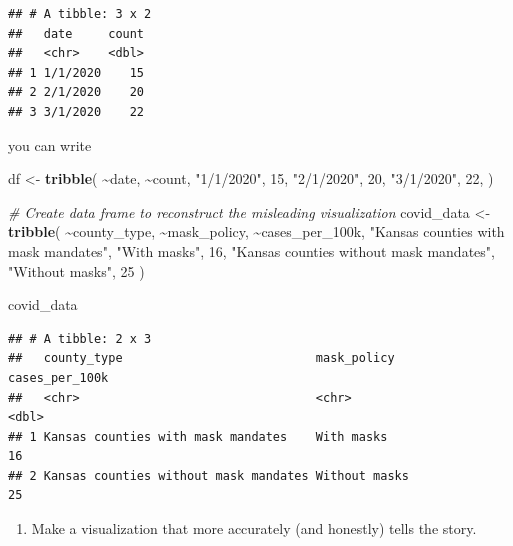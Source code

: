 \documentclass[
]{article}
\newenvironment{Shaded}{\begin{snugshade}}{\end{snugshade}}
\newcommand{\CommentTok}[1]{\textcolor[rgb]{0.56,0.35,0.01}{\textit{#1}}}
\newcommand{\DecValTok}[1]{\textcolor[rgb]{0.00,0.00,0.81}{#1}}
\newcommand{\FunctionTok}[1]{\textcolor[rgb]{0.13,0.29,0.53}{\textbf{#1}}}
\newcommand{\NormalTok}[1]{#1}
\newcommand{\OtherTok}[1]{\textcolor[rgb]{0.56,0.35,0.01}{#1}}
\newcommand{\SpecialCharTok}[1]{\textcolor[rgb]{0.81,0.36,0.00}{\textbf{#1}}}
\newcommand{\StringTok}[1]{\textcolor[rgb]{0.31,0.60,0.02}{#1}}
\providecommand{\tightlist}{%
  \setlength{\itemsep}{0pt}\setlength{\parskip}{0pt}}
\begin{document}
\begin{verbatim}
## # A tibble: 3 x 2
##   date     count
##   <chr>    <dbl>
## 1 1/1/2020    15
## 2 2/1/2020    20
## 3 3/1/2020    22
\end{verbatim}

you can write

\begin{Shaded}
\begin{Highlighting}[]
\NormalTok{df }\OtherTok{\textless{}{-}} \FunctionTok{tribble}\NormalTok{(}
  \SpecialCharTok{\textasciitilde{}}\NormalTok{date, }\SpecialCharTok{\textasciitilde{}}\NormalTok{count,}
  \StringTok{"1/1/2020"}\NormalTok{, }\DecValTok{15}\NormalTok{,}
  \StringTok{"2/1/2020"}\NormalTok{, }\DecValTok{20}\NormalTok{,}
  \StringTok{"3/1/2020"}\NormalTok{, }\DecValTok{22}\NormalTok{,}
\NormalTok{)}
\end{Highlighting}
\end{Shaded}

\begin{Shaded}
\begin{Highlighting}[]
\CommentTok{\# Create data frame to reconstruct the misleading visualization}
\NormalTok{covid\_data }\OtherTok{\textless{}{-}} \FunctionTok{tribble}\NormalTok{(}
  \SpecialCharTok{\textasciitilde{}}\NormalTok{county\_type, }\SpecialCharTok{\textasciitilde{}}\NormalTok{mask\_policy, }\SpecialCharTok{\textasciitilde{}}\NormalTok{cases\_per\_100k,}
  \StringTok{"Kansas counties with mask mandates"}\NormalTok{, }\StringTok{"With masks"}\NormalTok{, }\DecValTok{16}\NormalTok{,}
  \StringTok{"Kansas counties without mask mandates"}\NormalTok{, }\StringTok{"Without masks"}\NormalTok{, }\DecValTok{25}
\NormalTok{)}

\NormalTok{covid\_data}
\end{Highlighting}
\end{Shaded}

\begin{verbatim}
## # A tibble: 2 x 3
##   county_type                           mask_policy   cases_per_100k
##   <chr>                                 <chr>                  <dbl>
## 1 Kansas counties with mask mandates    With masks                16
## 2 Kansas counties without mask mandates Without masks             25
\end{verbatim}

\begin{enumerate}
\def\labelenumi{\arabic{enumi}.}
\setcounter{enumi}{1}
\tightlist
\item
  Make a visualization that more accurately (and honestly) tells the
  story.
\end{enumerate}
\end{document}
